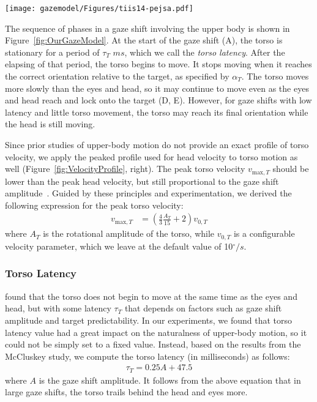 \begin{figure*}
\centering
\texttt{[image: gazemodel/Figures/tiis14-pejsa.pdf]}
\caption{Movement phases of the eyes, head, and torso in a gaze shift. Dashed area indicates that the torso may stop moving before or after the head.}
\label{fig:OurGazeModel}
\end{figure*}

The sequence of phases in a gaze shift involving the upper body is shown in Figure~\ref{fig:OurGazeModel}. At the start of the gaze shift (A), the torso is stationary for a period of $\tau_T$ $ms$, which we call the \emph{torso latency}. After the elapsing of that period, the torso begins to move. It stops moving when it reaches the correct orientation relative to the target, as specified by $\alpha_T$. The torso moves more slowly than the eyes and head, so it may continue to move even as the eyes and head reach and lock onto the target (D, E). However, for gaze shifts with low latency and little torso movement, the torso may reach its final orientation while the head is still moving.

Since prior studies of upper-body motion do not provide an exact profile of torso velocity, we apply the peaked profile used for head velocity to torso motion as well (Figure~\ref{fig:VelocityProfile}, right). The peak torso velocity $v_{\mathrm{max},T}$ should be lower than the peak head velocity, but still proportional to the gaze shift amplitude~\citep{mccluskey2007monkeys}. Guided by these principles and experimentation, we derived the following expression for the peak torso velocity:
%
\begin{align} \label{eq:TorsoVmax}
v_{\mathrm{max},T} &= (\frac{4}{3} \frac{A_T}{15} + 2) v_{0,T}
\end{align}
%
where $A_T$ is the rotational amplitude of the torso, while $v_{0,T}$ is a configurable velocity parameter, which we leave at the default value of 10$^{\circ}/s$.

\subsubsection{Torso Latency}

\citet{mccluskey2007monkeys} found that the torso does not begin to move at the same time as the eyes and head, but with some latency $\tau_T$ that depends on factors such as gaze shift amplitude and target predictability. In our experiments, we found that torso latency value had a great impact on the naturalness of upper-body motion, so it could not be simply set to a fixed value. Instead, based on the results from the McCluskey study, we compute the torso latency (in milliseconds) as follows:
%
\begin{align} \label{eq:TorsoLatency}
\tau_{T} = 0.25 A + 47.5
\end{align}
%
where $A$ is the gaze shift amplitude. It follows from the above equation that in large gaze shifts, the torso trails behind the head and eyes more.

